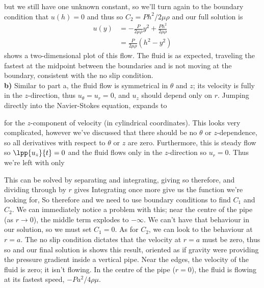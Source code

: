 \documentclass[12pt]{book}
\begin{document}
{but we still have one unknown constant, so we'll turn again to the boundary condition that $u(h)=0$ and thus
so $C_2 = Ph^2 / 2\mu\rho$ and our full solution is
\begin{align*}
u(y) &=  -\frac{P}{2\mu\rho}y^2 +\frac{Ph^2 }{ 2\mu\rho} \\
&=  \frac{P}{2\mu\rho}\left(h^2 - y^2\right)
\end{align*}
 shows a two-dimensional plot of this flow.  The fluid is as expected, traveling the fastest at the midpoint between the boundaries and is not moving at the boundary, consistent with the no slip condition.\\

\textbf{b) } Similar to part a, the fluid flow is symmetrical in $\theta$ and $z$; its velocity is fully in the $z$-direction, thus $u_\theta = u_r = 0$, and $u_z$ should depend only on $r$. Jumping directly into the Navier-Stokes equation,  expands to

for the $z$-component of velocity (in cylindrical coordinates).  This looks very complicated, however we've discussed that there should be no $\theta$ or $z$-dependence, so all derivatives with respect to $\theta$ or $z$ are zero.  Furthermore, this is steady flow so $\lpp{u_z}{t} = 0$ and the fluid flows only in the $z$-direction so $u_r = 0$.  Thus we're left with only

This can be solved by separating and integrating, giving
so therefore,
and dividing through by $r$ gives
Integrating once more give us the function we're looking for,
So therefore
and we need to use boundary conditions to find $C_1$ and $C_2$.  We can immediately notice a problem with this; near the centre of the pipe (as $r\to 0$), the middle term explodes to $-\infty$.  We can't have that behaviour in our solution, so we must set $C_1=0$.  As for $C_2$, we can look to the behaviour at $r=a$.  The no slip condition dictates that the velocity at $r=a$ must be zero, thus
so
and our final solution is
 shows this result, oriented as if gravity were providing the pressure gradient inside a vertical pipe.  Near the edges, the velocity of the fluid is zero; it isn't flowing.  In the centre of the pipe ($r=0$), the fluid is flowing at its fastest speed, $-Pa^2/4\rho\mu$.
}
\end{document}

